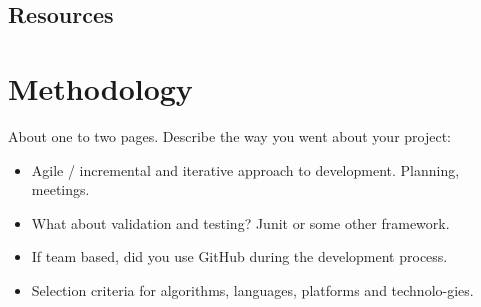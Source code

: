 \section{Resources}

\chapter{Methodology}
About one to two pages.
Describe the way you went about your project:
\begin{itemize}
\item Agile / incremental and iterative approach to development. Planning, meetings.
\item What about validation and testing? Junit or some other framework.
\item If team based, did you use GitHub during the development process.
\item Selection criteria for algorithms, languages, platforms and technolo-gies.
\end{itemize}

